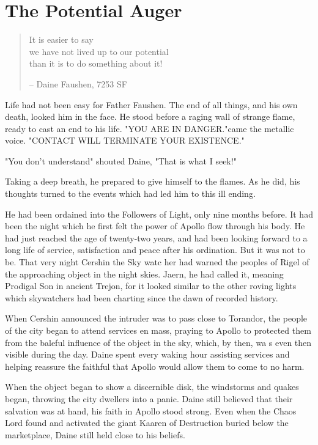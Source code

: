 \chapter{The Potential Auger}
\label{ch:augers}
\begin{quote}
\begin{center}
It is easier to say\\
we have not lived up to our potential\\
than it is to do something about it!
\end{center}
\hspace*{\fill} – Daine Faushen, 7253 SF
\end{quote}
Life had not been easy for Father Faushen. The end of all things, and his own death, looked him in the face. He stood before a raging wall of strange flame, ready to cast an end to his life.
"YOU ARE IN DANGER."came the metallic voice. "CONTACT WILL TERMINATE YOUR EXISTENCE."

"You don't understand" shouted Daine, "That is what I seek!"

Taking a deep breath, he prepared to give himself to the flames. As he did, his thoughts turned to the events which had led him to this ill ending.

He had been ordained into the Followers of Light, only nine months before. It had been the night which he first felt the power of Apollo flow through his body. He had just reached the age of twenty-two years, and had been looking forward to a long life of service, satisfaction and peace after his ordination. But it was not to be. That very night Cershin the Sky watc her had warned the peoples of Rigel of the approaching object in the night skies. Jaern, he had called it, meaning Prodigal Son in ancient Trejon, for it looked similar to the other roving lights which skywatchers had been charting since the dawn of recorded history.

When Cershin announced the intruder was to pass close to Torandor, the people of the city began to attend services en mass, praying to Apollo to protected them from the baleful influence of the object in the sky, which, by then, wa s even then visible during the day. Daine spent every waking hour assisting services and helping reassure the faithful that Apollo would allow them to come to no harm.

When the object began to show a discernible disk, the windstorms and quakes began, throwing the city dwellers into a panic. Daine still believed that their salvation was at hand, his faith in Apollo stood strong. Even when the Chaos Lord found and activated the giant Kaaren of Destruction buried below the marketplace, Daine still held close to his beliefs.

